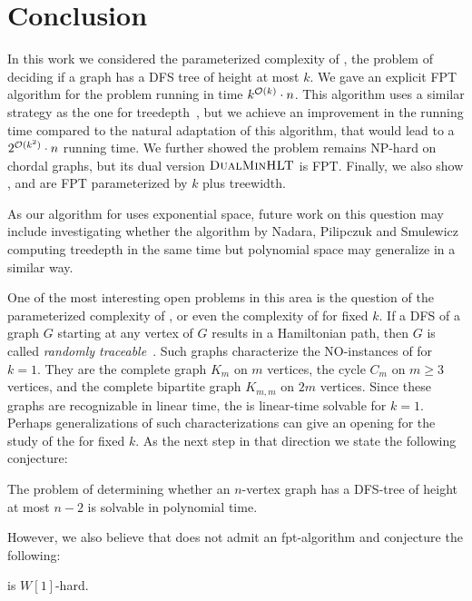 \documentclass[a4paper,11pt]{article}
\begin{document}
\section{Conclusion}
%
In this work we considered the parameterized complexity of \MinHProb, 
the problem of deciding if a graph has a DFS tree of height at most $k$. 
We gave an explicit FPT algorithm for the problem running in time $k^{{\mathcal{O}}(k)}\cdot n$. This algorithm uses a similar strategy as the one for treedepth~\cite{Reidl14}, but we achieve an improvement in the running time compared to the natural adaptation of this algorithm, that would lead to a $2^{{\mathcal{O}}(k^2)}\cdot n$ running time. We further showed the problem remains NP-hard on chordal graphs, but its dual version $\textsc{DualMinHLT}$ is FPT.
Finally, we also show \DualMinHProb, \MaxLLTProb and \MinLLTProb are FPT parameterized by $k$ plus treewidth. 

As our algorithm for \MinHProb uses exponential space,
future work on this question may include investigating whether the algorithm by Nadara, Pilipczuk and Smulewicz \cite{Nadara22} computing treedepth in the same time but polynomial space may generalize in a similar way.

%
One of the most interesting open problems in this area is the question of the parameterized complexity of \DualMinHProb,
or even the complexity of \DualMinHProb for fixed $k$.
%
If a DFS of a graph $G$ starting at any vertex of $G$ results in a Hamiltonian path, then $G$ is called \textit{randomly traceable}~\cite{ChartrandK1968}. Such graphs characterize the NO-instances of \DualMinHProb for $k = 1$. They are
the complete graph $K_m$ on $m$ vertices, the cycle $C_m$ on $m \ge 3$ vertices, and the complete bipartite graph $K_{m,m}$ on $2m$ vertices. Since these graphs are recognizable in linear time, the \DualMinHProb is linear-time solvable for $k = 1$.
Perhaps generalizations of such characterizations can give an opening for the study of the \DualMinHProb for fixed $k$. As the next step in that direction we state the following conjecture:

\begin{conjecture}
    The problem of determining whether an $n$-vertex graph
    has a DFS-tree of height at most $n-2$ 
    is solvable in polynomial time.
\end{conjecture}

However, we also believe that \DualMinHProb does not admit an fpt-algorithm and conjecture the following:

\begin{conjecture}
    \DualMinHProb is $W[1]$-hard.
\end{conjecture}
\end{document}
